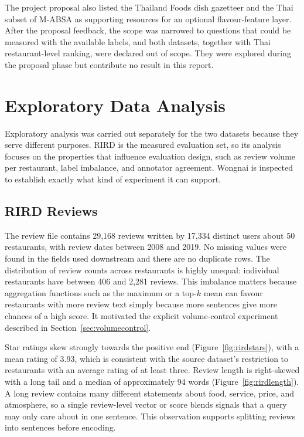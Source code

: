 The project proposal also listed the Thailand Foods dish gazetteer and the Thai subset of M-ABSA as supporting resources for an optional flavour-feature layer. After the proposal feedback, the scope was narrowed to questions that could be measured with the available labels, and both datasets, together with Thai restaurant-level ranking, were declared out of scope. They were explored during the proposal phase but contribute no result in this report.

\section{Exploratory Data Analysis}
\label{sec:eda}

Exploratory analysis was carried out separately for the two datasets because they serve different purposes. RIRD is the measured evaluation set, so its analysis focuses on the properties that influence evaluation design, such as review volume per restaurant, label imbalance, and annotator agreement. Wongnai is inspected to establish exactly what kind of experiment it can support.

\subsection{RIRD Reviews}
\label{sec:edarird}

The review file contains 29,168 reviews written by 17,334 distinct users about 50 restaurants, with review dates between 2008 and 2019. No missing values were found in the fields used downstream and there are no duplicate rows. The distribution of review counts across restaurants is highly unequal: individual restaurants have between 406 and 2,281 reviews. This imbalance matters because aggregation functions such as the maximum or a top-$k$ mean can favour restaurants with more review text simply because more sentences give more chances of a high score. It motivated the explicit volume-control experiment described in Section~\ref{sec:volumecontrol}.

Star ratings skew strongly towards the positive end (Figure~\ref{fig:rirdstars}), with a mean rating of 3.93, which is consistent with the source dataset's restriction to restaurants with an average rating of at least three. Review length is right-skewed with a long tail and a median of approximately 94 words (Figure~\ref{fig:rirdlength}). A long review contains many different statements about food, service, price, and atmosphere, so a single review-level vector or score blends signals that a query may only care about in one sentence. This observation supports splitting reviews into sentences before encoding.

